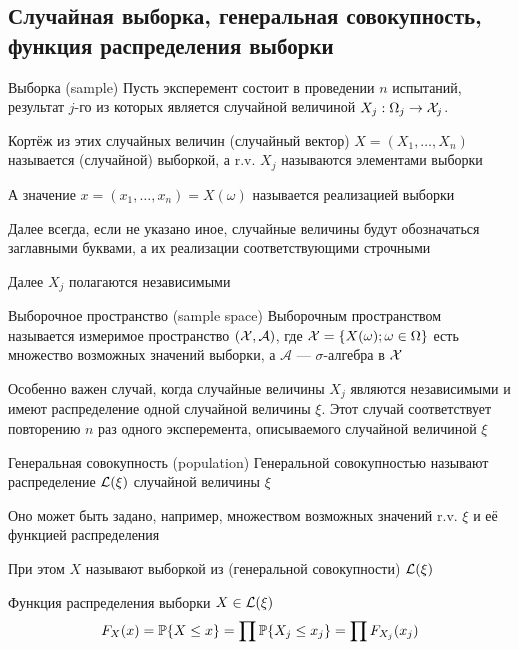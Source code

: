 \subsection{Случайная выборка, генеральная совокупность, функция распределения выборки}

\begin{dfn}{Выборка (sample)}
Пусть эксперемент состоит в проведении $n$ испытаний,
результат $j$-го из которых
является случайной величиной $X_j: \Omega_j\to\mathcal X_j$.

Кортёж из этих случайных величин (случайный вектор)
$X = (X_1, \dotsc, X_n)$ называется (случайной) выборкой,
а r.v. $X_j$ называются элементами выборки

А значение $x = (x_1, \dotsc, x_n) = X(\omega)$ называется реализацией выборки

Далее всегда, если не указано иное,
случайные величины будут обозначаться заглавными буквами,
а их реализации соответствующими строчными

Далее $X_j$ полагаются независимыми
\end{dfn}

\begin{dfn}{Выборочное пространство (sample space)}
Выборочным пространством
называется измеримое пространство
$(\mathcal X, \mathcal A)$,
где $\mathcal X = \{X(\omega) ; \omega\in\Omega\}$
есть множество возможных значений выборки,
а $\mathcal A$ --- $\sigma$-алгебра в $\mathcal X$
\end{dfn}

Особенно важен случай, когда случайные величины $X_j$
являются независимыми и
имеют распределение одной случайной величины $\xi$.
Этот случай соответствует повторению $n$ раз одного эксперемента,
описываемого случайной величиной $\xi$

\begin{dfn}{Генеральная совокупность (population)}
Генеральной совокупностью
называют распределение $\mathcal L(\xi)$ случайной величины $\xi$

Оно может быть задано, например, множеством возможных значений r.v. $\xi$
и её функцией распределения

При этом $X$ называют выборкой из (генеральной совокупности) $\mathcal L(\xi)$
\end{dfn}

\begin{dfn}{Функция распределения выборки}
 $X\in\mathcal L(\xi)$
$$F_X(x) = \mathbb P\{X\leq x\} = \prod\mathbb P\{X_j\leq x_j\} = \prod F_{X_j}(x_j)$$
\end{dfn}
